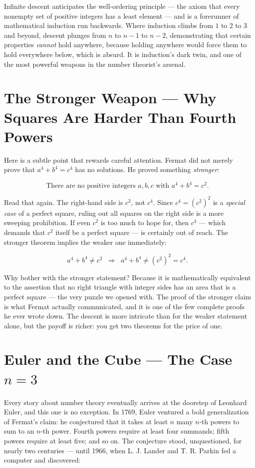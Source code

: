 \documentclass[11pt,twoside,openright]{book}
\theoremstyle{definition}
\theoremstyle{remark}
\begin{document}
Infinite descent anticipates the well-ordering principle --- the axiom that every nonempty set of positive integers has a least element --- and is a forerunner of mathematical induction run backwards. Where induction climbs from $1$ to $2$ to $3$ and beyond, descent plunges from $n$ to $n - 1$ to $n - 2$, demonstrating that certain properties \textit{cannot} hold anywhere, because holding anywhere would force them to hold everywhere below, which is absurd. It is induction's dark twin, and one of the most powerful weapons in the number theorist's arsenal.


\section{The Stronger Weapon --- Why Squares Are Harder Than Fourth Powers}

Here is a subtle point that rewards careful attention. Fermat did not merely prove that $a^4 + b^4 = c^4$ has no solutions. He proved something \textit{stronger}:

\[\text{There are no positive integers } a, b, c \text{ with } a^4 + b^4 = c^2.\]

Read that again. The right-hand side is $c^2$, not $c^4$. Since $c^4 = (c^2)^2$ is a \textit{special case} of a perfect square, ruling out all squares on the right side is a more sweeping prohibition. If even $c^2$ is too much to hope for, then $c^4$ --- which demands that $c^2$ itself be a perfect square --- is certainly out of reach. The stronger theorem implies the weaker one immediately:

\[a^4 + b^4 \neq c^2 \;\;\Longrightarrow\;\; a^4 + b^4 \neq (c^2)^2 = c^4.\]


Why bother with the stronger statement? Because it is mathematically equivalent to the assertion that no right triangle with integer sides has an area that is a perfect square --- the very puzzle we opened with. The proof of the stronger claim is what Fermat actually communicated, and it is one of the few complete proofs he ever wrote down. The descent is more intricate than for the weaker statement alone, but the payoff is richer: you get two theorems for the price of one.


\section{Euler and the Cube --- The Case $n = 3$}

Every story about number theory eventually arrives at the doorstep of Leonhard Euler, and this one is no exception. In 1769, Euler ventured a bold generalization of Fermat's claim: he conjectured that it takes at least $n$ many $n$-th powers to sum to an $n$-th power. Fourth powers require at least four summands; fifth powers require at least five; and so on. The conjecture stood, unquestioned, for nearly two centuries --- until 1966, when L. J. Lander and T. R. Parkin fed a computer and discovered:
\end{document}
